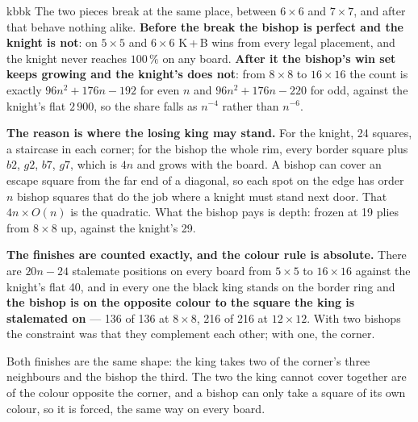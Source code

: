\documentclass[10pt]{article}
\begin{document}
\begin{result}[title={One bishop beats one knight, and range is the reason}]{kbbk}
The two pieces break at the same place, between $6\times6$ and $7\times7$, and
after that behave nothing alike. \textbf{Before the break the bishop is perfect
and the knight is not}: on $5\times5$ and $6\times6$ K\,+\,B wins from every
legal placement, and the knight never reaches $100\,\%$ on any board.
\textbf{After it the bishop's win set keeps growing and the knight's does
not}: from $8\times8$ to $16\times16$ the count is exactly $96n^2+176n-192$ for
even $n$ and $96n^2+176n-220$ for odd, against the knight's flat $2\,900$, so
the share falls as $n^{-4}$ rather than $n^{-6}$.

\smallskip
\textbf{The reason is where the losing king may stand.} For the knight, 24
squares, a staircase in each corner; for the bishop the whole rim, every border
square plus $b2$, $g2$, $b7$, $g7$, which is $4n$ and grows with the board. A
bishop can cover an escape square from the far end of a diagonal, so each spot
on the edge has order $n$ bishop squares that do the job where a knight must
stand next door. That $4n\times O(n)$ is the quadratic. What the bishop pays is
depth: frozen at 19 plies from $8\times8$ up, against the knight's 29.
\end{result}

\noindent
\textbf{The finishes are counted exactly, and the colour rule is absolute.}
There are $20n-24$ stalemate positions on every board from $5\times5$ to
$16\times16$ against the knight's flat 40, and in every one the black king
stands on the border ring and \textbf{the bishop is on the opposite colour to
the square the king is stalemated on} --- 136 of 136 at $8\times8$, 216 of 216
at $12\times12$. With two bishops the constraint was that they complement each
other; with one, the corner.

\medskip
\noindent
\begin{minipage}[t]{0.32\textwidth}
\end{minipage}\hfill
\begin{minipage}[t]{0.32\textwidth}
\end{minipage}\hfill
\begin{minipage}[t]{0.32\textwidth}\vspace{0pt}\small
Both finishes are the same shape: the king takes two of the corner's three
neighbours and the bishop the third. The two the king cannot cover together are
of the colour opposite the corner, and a bishop can only take a square of its
own colour, so it is forced, the same way on every board.
\end{minipage}
\end{document}
